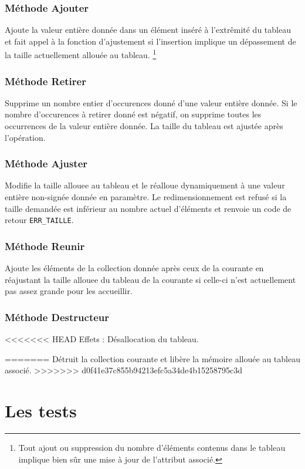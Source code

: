 \documentclass[11pt]{article}
\begin{document}
\subsubsection*{Méthode Ajouter}
Ajoute la valeur entière donnée dans un élément inséré à l'extrêmité du tableau et fait appel à la fonction d'ajustement si l'insertion implique un dépassement de la taille actuellement allouée au tableau.
\footnote{Tout ajout ou suppression du nombre d'éléments contenus dans le tableau implique bien sûr une mise à jour de l'attribut associé.}

\subsubsection*{Méthode Retirer}
Supprime un nombre entier d'occurences donné d'une valeur entière donnée. Si le nombre d'occurences à retirer donné est négatif, on supprime toutes les occurrences de la valeur entière donnée. La taille du tableau est ajustée après l'opération. 

\subsubsection*{Méthode Ajuster}
Modifie la taille allouee au tableau et le réalloue dynamiquement à une valeur entière non-signée donnée en paramètre. Le redimensionnement est refusé si la taille demandée est inférieur au nombre actuel d'éléments et renvoie un code de retour \texttt{ERR\_TAILLE}.
    
\subsubsection*{Méthode Reunir}
Ajoute les éléments de la collection donnée après ceux de la courante en réajustant la taille allouee du tableau de la courante si celle-ci n'est actuellement pas assez grande pour les accueillir.

\subsubsection*{Méthode Destructeur}
<<<<<<< HEAD
\noindent Effets : Désallocation du tableau.
\newpage

=======
Détruit la collection courante et libère la mémoire allouée au tableau associé.
>>>>>>> d0f41e37c855b94213efc5a34de4b15258795c3d

\section{Les tests}
\end{document}
